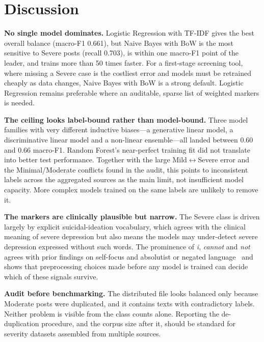\documentclass[conference]{IEEEtran}
\begin{document}
\section{Discussion}

\textbf{No single model dominates.} Logistic Regression with TF-IDF gives the best overall balance (macro-F1 0.661), but Naive Bayes with BoW is the most sensitive to Severe posts (recall 0.703), is within one macro-F1 point of the leader, and trains more than 50 times faster. For a first-stage screening tool, where missing a Severe case is the costliest error and models must be retrained cheaply as data changes, Naive Bayes with BoW is a strong default. Logistic Regression remains preferable where an auditable, sparse list of weighted markers is needed.

\textbf{The ceiling looks label-bound rather than model-bound.} Three model families with very different inductive biases---a generative linear model, a discriminative linear model and a non-linear ensemble---all landed between 0.60 and 0.66 macro-F1. Random Forest's near-perfect training fit did not translate into better test performance. Together with the large Mild$\leftrightarrow$Severe error and the Minimal/Moderate conflicts found in the audit, this points to inconsistent labels across the aggregated sources as the main limit, not insufficient model capacity. More complex models trained on the same labels are unlikely to remove it.

\textbf{The markers are clinically plausible but narrow.} The Severe class is driven largely by explicit suicidal-ideation vocabulary, which agrees with the clinical meaning of severe depression but also means the models may under-detect severe depression expressed without such words. The prominence of \textit{i}, \textit{cannot} and \textit{not} agrees with prior findings on self-focus and absolutist or negated language~\cite{rude2004language,almosaiwi2018absolute} and shows that preprocessing choices made before any model is trained can decide which of these signals survive.

\textbf{Audit before benchmarking.} The distributed file looks balanced only because Moderate posts were duplicated, and it contains texts with contradictory labels. Neither problem is visible from the class counts alone. Reporting the de-duplication procedure, and the corpus size after it, should be standard for severity datasets assembled from multiple sources.
\end{document}
